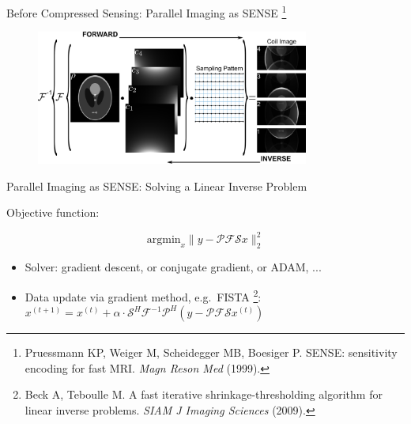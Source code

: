 \begin{frame}{Before Compressed Sensing: Parallel Imaging as SENSE \footnote{Pruessmann KP, Weiger M, Scheidegger MB, Boesiger P. SENSE: sensitivity encoding for fast MRI. \textit{Magn Reson Med} (1999).}}

	\begin{figure}
		\includegraphics[width=0.8\textwidth]{fig/mri-pi.png}
	\end{figure}

\end{frame}


\begin{frame}{Parallel Imaging as SENSE: Solving a Linear Inverse Problem}

	Objective function:

	\begin{equation}
		\mathrm{argmin}_x \lVert y -  \mathcal{P} \mathcal{F} \mathcal{S} x \rVert_2^2
	\end{equation}

	\vfill

	\begin{itemize}
		\item Solver: gradient descent, or conjugate gradient, or ADAM, ...
		\vspace{1em}
		\item Data update via gradient method, e.g.~FISTA \footnote{Beck A, Teboulle M. A fast iterative shrinkage-thresholding algorithm for linear inverse problems. \textit{SIAM J Imaging Sciences} (2009).}: \\
		\vspace{1em}
		\hspace{5em} $x^{(t+1)} = x^{(t)} + \alpha \cdot \mathcal{S}^H \mathcal{F}^{-1} \mathcal{P}^{H} (y - \mathcal{P} \mathcal{F} \mathcal{S} x^{(t)})$
	\end{itemize}

\end{frame}


